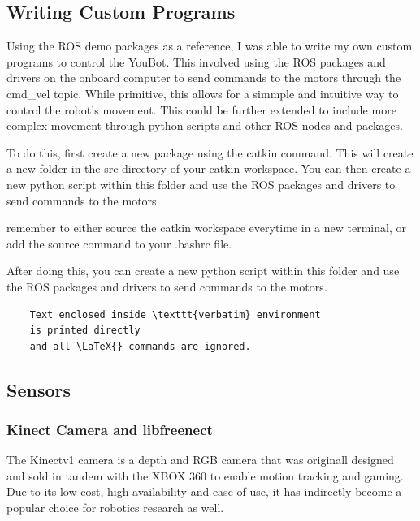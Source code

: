 \documentclass[a4paper, 12pt]{article}
\begin{document}
    \pagebreak


    \subsection{Writing Custom Programs}

    Using the ROS demo packages as a reference, I was able to write my own custom programs to control the YouBot. This involved using the ROS packages and drivers on the onboard computer to send commands to the motors through the \/cmd\_vel topic. While primitive, this allows for a simmple and intuitive way to control the robot's movement. This could be further extended to include more complex movement through python scripts and other ROS nodes and packages.

    To do this, first create a new package using the catkin command. This will create a new folder in the src directory of your catkin workspace. You can then create a new python script within this folder and use the ROS packages and drivers to send commands to the motors.

    remember to either source the catkin workspace everytime in a new terminal, or add the source command to your .bashrc file.

    After doing this, you can create a new python script within this folder and use the ROS packages and drivers to send commands to the motors. 

    

    \begin{verbatim}
    Text enclosed inside \texttt{verbatim} environment 
    is printed directly 
    and all \LaTeX{} commands are ignored.
    \end{verbatim}


    
    
    \subsection{Sensors}
    \subsubsection{Kinect Camera and libfreenect}

    The Kinectv1 camera is a depth and RGB camera that was originall designed and sold in tandem with the XBOX 360 to enable motion tracking and gaming. Due to its low cost, high availability and ease of use, it has indirectly become a popular choice for robotics research as well. 
\end{document}
